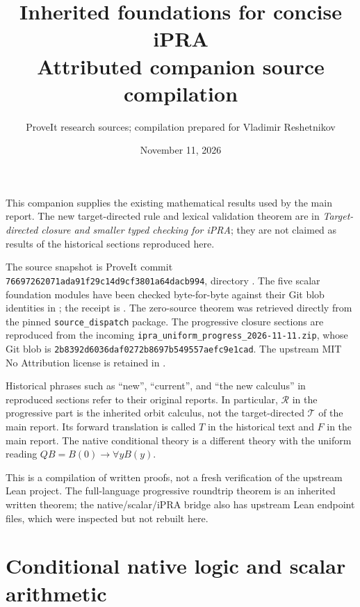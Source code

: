 \documentclass[11pt,a4paper]{article}
\title{\color{ink}\textbf{Inherited foundations for concise iPRA}\\[6pt]\large Attributed companion source compilation}
\author{ProveIt research sources; compilation prepared for Vladimir Reshetnikov}
\date{November 11, 2026}
\theoremstyle{definition}\newtheorem{definition}[theorem]{Definition}
\begin{document}
\maketitle
This companion supplies the existing mathematical results used by the main
report. The new target-directed rule and lexical validation theorem are in
\emph{Target-directed closure and smaller typed checking for iPRA}; they are
not claimed as results of the historical sections reproduced here.

The source snapshot is ProveIt commit
\texttt{76697262071ada91f29c14d9cf3801a64dacb994}, directory
. The five scalar
foundation modules have been checked byte-for-byte against their Git blob
identities in ; the receipt is
. The zero-source theorem was
retrieved directly from the pinned \texttt{source\_dispatch} package. The
progressive closure sections are reproduced from the incoming
\texttt{ipra\_uniform\_progress\_2026-11-11.zip}, whose Git blob is
\texttt{2b8392d6036daf0272b8697b549557aefc9e1cad}. The upstream MIT No
Attribution license is retained in .

Historical phrases such as ``new'', ``current'', and ``the new calculus''
in reproduced sections refer to their original reports. In particular,
$\mathcal R$ in the progressive part is the inherited orbit calculus,
not the target-directed $\mathcal T$ of the main report. Its forward
translation is called $T$ in the historical text and $F$ in the main
report. The native conditional theory is a different theory with the
uniform reading $Q B=B(0)\to\forall y B(y)$.

This is a compilation of written proofs, not a fresh verification of the
upstream Lean project. The full-language progressive roundtrip theorem
is an inherited written theorem; the native/scalar/iPRA bridge also has
upstream Lean endpoint files, which were inspected but not rebuilt here.

\setcounter{tocdepth}{1}
{\small\tableofcontents}
\clearpage
\part{Conditional native logic and scalar arithmetic}

\end{document}

